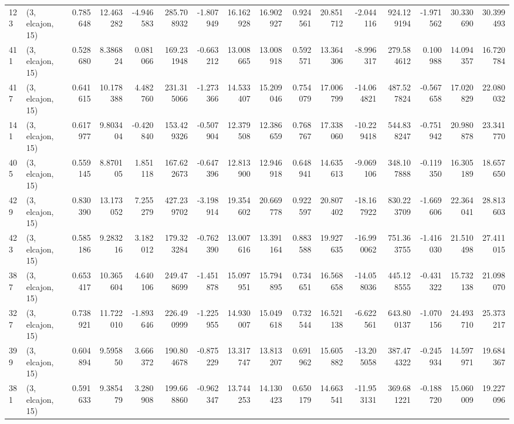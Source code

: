 \begin{tabular}{llrrrrrrrrrrrrrr}
123 &  (3, elcajon, 15) &   0.785648 &  12.463282 &  -4.946583 &   285.708932 &  -1.807949 &  16.162928 &  16.902927 &  0.924561 &  20.851712 &  -2.044116 &   924.129194 &  -1.971562 &  30.330690 &  30.399493 \\
411 &  (3, elcajon, 15) &   0.528680 &   8.386824 &   0.081066 &   169.231948 &  -0.663212 &  13.008665 &  13.008918 &  0.592571 &  13.364306 &  -8.996317 &   279.584612 &   0.100988 &  14.094357 &  16.720784 \\
417 &  (3, elcajon, 15) &   0.641615 &  10.178388 &   4.482760 &   231.315066 &  -1.273366 &  14.533407 &  15.209046 &  0.754079 &  17.006799 & -14.064821 &   487.527824 &  -0.567658 &  17.020829 &  22.080032 \\
141 &  (3, elcajon, 15) &   0.617977 &   9.803404 &  -0.420840 &   153.429326 &  -0.507904 &  12.379508 &  12.386659 &  0.768767 &  17.338060 & -10.229418 &   544.838247 &  -0.751942 &  20.980878 &  23.341770 \\
405 &  (3, elcajon, 15) &   0.559145 &   8.870105 &   1.851118 &   167.622673 &  -0.647396 &  12.813900 &  12.946918 &  0.648941 &  14.635613 &  -9.069106 &   348.107888 &  -0.119350 &  16.305189 &  18.657650 \\
429 &  (3, elcajon, 15) &   0.830390 &  13.173052 &   7.255279 &   427.239702 &  -3.198914 &  19.354602 &  20.669778 &  0.922597 &  20.807402 & -18.167922 &   830.223709 &  -1.669606 &  22.364041 &  28.813603 \\
423 &  (3, elcajon, 15) &   0.585186 &   9.283216 &   3.182012 &   179.323284 &  -0.762390 &  13.007616 &  13.391164 &  0.883588 &  19.927635 & -16.990062 &   751.363755 &  -1.416030 &  21.510498 &  27.411015 \\
387 &  (3, elcajon, 15) &   0.653417 &  10.365604 &   4.640106 &   249.478699 &  -1.451878 &  15.097951 &  15.794895 &  0.734651 &  16.568658 & -14.058036 &   445.128555 &  -0.431322 &  15.732138 &  21.098070 \\
327 &  (3, elcajon, 15) &   0.738921 &  11.722010 &  -1.893646 &   226.490999 &  -1.225955 &  14.930007 &  15.049618 &  0.732544 &  16.521138 &  -6.622561 &   643.800137 &  -1.070156 &  24.493710 &  25.373217 \\
399 &  (3, elcajon, 15) &   0.604894 &   9.595850 &   3.666372 &   190.804678 &  -0.875229 &  13.317747 &  13.813207 &  0.691962 &  15.605882 & -13.205058 &   387.474322 &  -0.245934 &  14.597971 &  19.684367 \\
381 &  (3, elcajon, 15) &   0.591633 &   9.385479 &   3.280908 &   199.668860 &  -0.962347 &  13.744253 &  14.130423 &  0.650179 &  14.663541 & -11.953131 &   369.681221 &  -0.188720 &  15.060009 &  19.227096 \\

\end{tabular}
